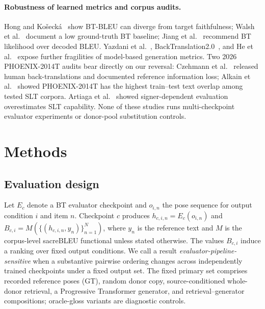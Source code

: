\documentclass[pdflatex,sn-chicago]{sn-jnl}
\begin{document}
\paragraph{Robustness of learned metrics and corpus audits.}
Hong and Ko\v{s}eck\'{a}~\cite{hong2026conditional} show BT-BLEU can diverge from target faithfulness; Walsh et al.~\cite{walsh2024datadriven} document a low ground-truth BT baseline; Jiang et al.~\cite{jiang2025meaningful} recommend BT likelihood over decoded BLEU. Yazdani et al.~\cite{yazdani2025critical}, BackTranslation2.0~\cite{backtranslation2}, and He et al.~\cite{he2023blind} expose further fragilities of model-based generation metrics. Two 2026 PHOENIX-2014T audits bear directly on our reversal: Czehmann et al.~\cite{czehmann2026sacred} released human back-translations and documented reference information loss; Alkain et al.~\cite{alkain2026critical} showed PHOENIX-2014T has the highest train--test text overlap among tested SLT corpora. Artiaga et al.~\cite{artiaga2025signer} showed signer-dependent evaluation overestimates SLT capability. None of these studies runs multi-checkpoint evaluator experiments or donor-pool substitution controls.

\section{Methods}
\label{sec:method}

\subsection{Evaluation design}
Let $E_c$ denote a BT evaluator checkpoint and $o_{i,n}$ the pose sequence for output condition $i$ and item $n$. Checkpoint $c$ produces $h_{c,i,n}=E_c(o_{i,n})$ and $B_{c,i}=M(\{(h_{c,i,n},y_n)\}_{n=1}^{N})$, where $y_n$ is the reference text and $M$ is the corpus-level sacreBLEU functional unless stated otherwise. The values $B_{c,i}$ induce a ranking over fixed output conditions. We call a result \emph{evaluator-pipeline-sensitive} when a substantive pairwise ordering changes across independently trained checkpoints under a fixed output set. The fixed primary set comprises recorded reference poses (GT), random donor copy, source-conditioned whole-donor retrieval, a Progressive Transformer generator, and retrieval--generator compositions; oracle-gloss variants are diagnostic controls.
\end{document}
